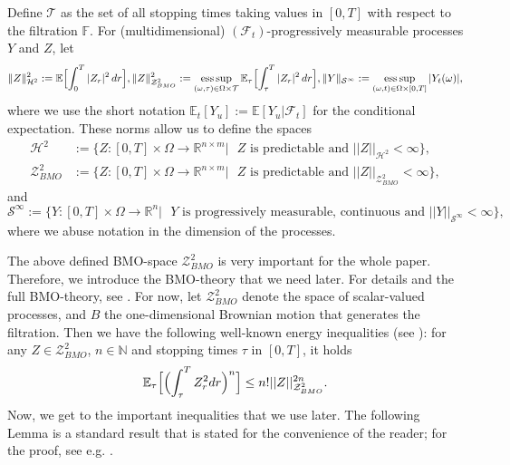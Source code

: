 \documentclass[10pt,a4paper]{article}
\newcommand{\MF}{{\mathcal{F}}}
\theoremstyle{plain}
\newtheorem{Definition}[Theorem]{Definition}
\theoremstyle{definition}
\numberwithin{equation}{section}
\begin{document}
Define $\mathcal{T}$ as the set of all stopping times taking values in $[0,T]$ with respect to the filtration $\mathbb{F}$. For (multidimensional) $(\MF_t)$-progressively measurable processes $Y$ and $Z$, let 
\[
\|Z\|_{\mathcal{H}^{2}}^{2} := \mathbb{E}\Bigl[\int_0^T |Z_r|^2\,dr\Bigr],
\|Z\|_{\mathcal{Z}^{2}_{BMO}}^{2} := \operatorname*{ess\,sup}_{(\omega,\tau)\in\Omega\times\mathcal{T}} \mathbb{E}_{\tau}\Bigl[\int_{\tau}^{T}|Z_r|^2\,dr\Bigr],
\|Y\|_{\mathcal{S}^{\infty}} := \operatorname*{ess\,sup}_{(\omega,t)\in\Omega\times[0,T]} |Y_t(\omega)|,
\]
where we use the short notation $\mathbb{E}_{t}[Y_{u}] := \mathbb{E}[Y_{u}|\mathcal{F}_{t}]$ for the conditional expectation. These norms allow us to define the spaces
\begin{align*}
\mathcal{H}^{2} &:= \bigl\{ Z: [0,T]\times \Omega \rightarrow \mathbb{R}^{n \times m} | \text{ $Z$ is predictable and } ||Z||_{\mathcal{H}^{2}} < \infty\bigr\}, \\ 
\mathcal{Z}^{2}_{BMO} &:= \bigl\{ Z: [0,T]\times \Omega \rightarrow \mathbb{R}^{n \times m} | \text{ $Z$ is predictable and } ||Z||_{\mathcal{Z}^{2}_{BMO}} < \infty\bigr\},
\end{align*}
and
\[
\mathcal{S}^{\infty} := \bigl\{ Y: [0,T]\times \Omega \rightarrow \mathbb{R}^{n} | \text{ $Y$ is progressively measurable, continuous and } ||Y||_{\mathcal{S}^{\infty}} < \infty \bigr\},
\]
where we abuse notation in the dimension of the processes. 

 
The above defined BMO-space $\mathcal{Z}_{BMO}^{2}$ is very important for the whole paper. Therefore, we introduce the BMO-theory that we need later. For details and the full BMO-theory, see \cite{Ref3}. For now, let $\mathcal{Z}_{BMO}^{2}$ denote the space of scalar-valued processes, and $B$ the one-dimensional Brownian motion that generates the filtration.
Then we have the following well-known energy inequalities (see \cite[Lemma 9.6.5]{RefN11}): 
for any $Z \in \mathcal{Z}_{BMO}^{2}$, $n \in \mathbb{N}$ and stopping times $\tau$ in $[0,T]$, it holds
\begin{equation}
\label{equ:BMO.1}
\mathbb{E}_{\tau}\Bigl[\Bigl(\int_{\tau}^{T}Z_{r}^{2}dr\Bigr)^{n}\Bigr] \leq n!||Z||_{\mathcal{Z}_{BMO}^{2}}^{2n}.
\end{equation}
Now, we get to the important inequalities that we use later. The following Lemma is a standard result that is stated for the convenience of the reader; for the proof, see e.g. \cite[Theorem 2.2]{Ref3}.
\end{document}
